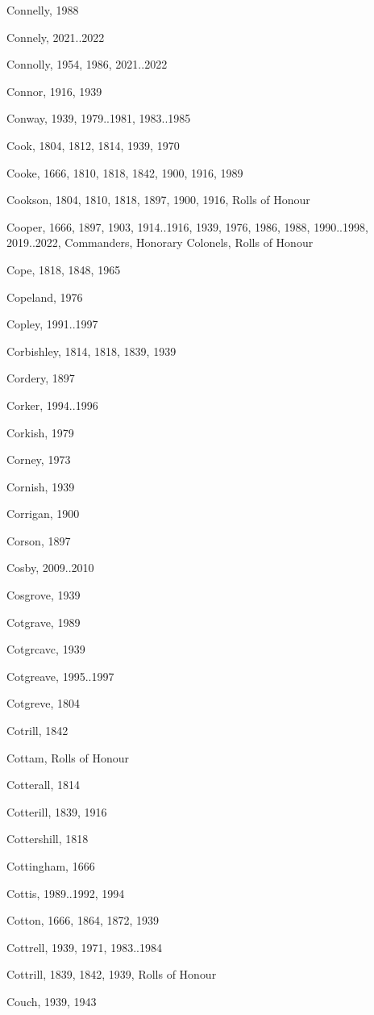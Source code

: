 \begin{theindex}
\item Connelly, 1988
\item Connely, 2021..2022
\item Connolly, 1954, 1986, 2021..2022
\item Connor, 1916, 1939
\item Conway, 1939, 1979..1981, 1983..1985
\item Cook, 1804, 1812, 1814, 1939, 1970
\item Cooke, 1666, 1810, 1818, 1842, 1900, 1916, 1989
\item Cookson, 1804, 1810, 1818, 1897, 1900, 1916, Rolls of Honour
\item Cooper, 1666, 1897, 1903, 1914..1916, 1939, 1976, 1986, 1988, 1990..1998, 2019..2022, Commanders, Honorary Colonels, Rolls of Honour
\item Cope, 1818, 1848, 1965
\item Copeland, 1976
\item Copley, 1991..1997
\item Corbishley, 1814, 1818, 1839, 1939
\item Cordery, 1897
\item Corker, 1994..1996
\item Corkish, 1979
\item Corney, 1973
\item Cornish, 1939
\item Corrigan, 1900
\item Corson, 1897
\item Cosby, 2009..2010
\item Cosgrove, 1939
\item Cotgrave, 1989
\item Cotgrcavc, 1939
\item Cotgreave, 1995..1997
\item Cotgreve, 1804
\item Cotrill, 1842
\item Cottam, Rolls of Honour
\item Cotterall, 1814
\item Cotterill, 1839, 1916
\item Cottershill, 1818
\item Cottingham, 1666
\item Cottis, 1989..1992, 1994
\item Cotton, 1666, 1864, 1872, 1939
\item Cottrell, 1939, 1971, 1983..1984
\item Cottrill, 1839, 1842, 1939, Rolls of Honour
\item Couch, 1939, 1943

\end{theindex}
